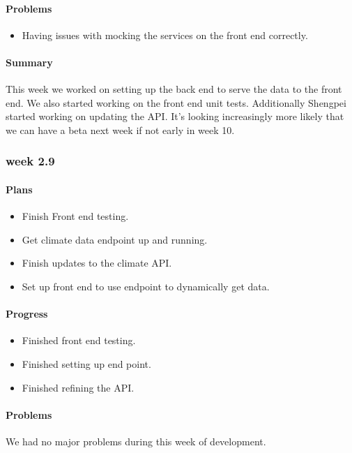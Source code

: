 \documentclass[onecolumn, draftclsnofoot,10pt, compsoc]{article}
\begin{document}
			\paragraph{Problems} \hfill \break
				\begin{itemize}
					\item Having issues with mocking the services on the front end correctly.
				\end{itemize}
			\paragraph{Summary} \hfill \break
			This week we worked on setting up the back end to serve the data to the front end. We also started working on the front end unit tests. Additionally Shengpei started working on updating the API. It's looking increasingly more likely that we can have a beta next week if not early in week 10.\\
			
		\subsubsection{week 2.9}
			\paragraph{Plans} \hfill \break
				\begin{itemize}
					\item Finish Front end testing.
					\item Get climate data endpoint up and running.
					\item Finish updates to the climate API.
					\item Set up front end to use endpoint to dynamically get data.
				\end{itemize}
			\paragraph{Progress} \hfill \break
				\begin{itemize}
					\item Finished front end testing.
					\item Finished setting up end point.
					\item Finished refining the API.
				\end{itemize}
			\paragraph{Problems} \hfill \break 
				We had no major problems during this week of development.\\
\end{document}
